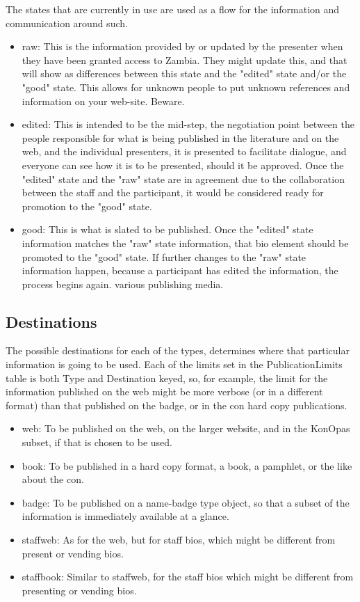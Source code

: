 \documentclass[captions=tablesignature]{scrartcl}
\begin{document}
The states that are currently in use are used as a flow for the
information and communication around such.
\begin{itemize}
\item raw: This is the information provided by or updated by the
presenter when they have been granted access to Zambia.  They
might update this, and that will show as differences between this
state and the "edited" state and/or the "good" state.  This
allows for unknown people to put unknown references and
information on your web-site.  Beware.
\item edited: This is intended to be the mid-step, the negotiation
point between the people responsible for what is being published
in the literature and on the web, and the individual presenters,
it is presented to facilitate dialogue, and everyone can see how
it is to be presented, should it be approved.  Once the "edited"
state and the "raw" state are in agreement due to the
collaboration between the staff and the participant, it would be
considered ready for promotion to the "good" state.
\item good: This is what is slated to be published.  Once the "edited"
state information matches the "raw" state information, that bio
element should be promoted to the "good" state. If further
changes to the "raw" state information happen, because a
participant has edited the information, the process begins again.
various publishing media.
\end{itemize}

\subsection{Destinations}
\label{sec-2-3}

The possible destinations for each of the types, determines where
that particular information is going to be used.  Each of the
limits set in the PublicationLimits table is both Type and
Destination keyed, so, for example, the limit for the information
published on the web might be more verbose (or in a different
format) than that published on the badge, or in the con hard copy
publications.
\begin{itemize}
\item web: To be published on the web, on the larger website, and in
the KonOpas subset, if that is chosen to be used.
\item book: To be published in a hard copy format, a book, a pamphlet,
or the like about the con.
\item badge: To be published on a name-badge type object, so that a
subset of the information is immediately available at a glance.
\item staffweb: As for the web, but for staff bios, which might be
different from present or vending bios.
\item staffbook: Similar to staffweb, for the staff bios which might be
different from presenting or vending bios.
\end{itemize}
\end{document}
